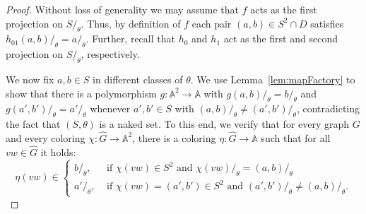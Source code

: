 \documentclass[10pt,a4paper]{amsart}
\newcommand{\str}[1]{\mathbb{#1}}
\begin{document}
\begin{proof}
  
Without loss of generality we may assume that $f$ acts as the first projection on $S/_\theta$. Thus, by definition of $f$ each pair $(a,b) \in S^2 \cap D$ satisfies $h_{01}(a,b)/_\theta = a/_\theta$.
Further, recall that $h_0$ and $h_1$ act as the first and second projection on $S/_\theta$, respectively.
 
We now fix $a,b\in S$ in different classes of $\theta$.
We use Lemma~\ref{lem:mapFactory} to show that there is a polymorphism $g: \str A^2 \rightarrow \str A$ with $g(a,b)/_\theta = b/_\theta$ and $g(a',b')/_\theta = a'/_\theta$ whenever $a',b'\in S$ with $(a,b)/_\theta\not= (a',b')/_\theta$, contradicting the fact that $(S,\theta)$ is a naked set.
To this end, we verify that for every graph $G$ and every coloring $\chi\colon \hat G\to \str A^2$, there is a coloring $\eta\colon \hat G\to \str A$ such that for all $vw \in \hat G$ it holds:
\begin{equation*}
    \eta(vw) \in 
\begin{cases}
    b/_\theta, &\text{ if } \chi(v w) \in S^2 \text{ and } \chi(v w)/_\theta = (a,b)/_\theta \\
    a'/_\theta, &\text{ if } \chi(vw) = (a',b') \in S^2\text{ and } (a',b')/_\theta \not= (a,b)/_\theta.
\end{cases}
\end{equation*}


\end{proof}
\end{document}
